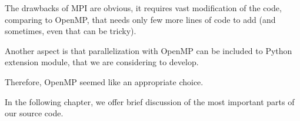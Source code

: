 The drawbacks of MPI are obvious, it requires vast modification of the code, comparing to OpenMP, that needs only few more lines of code to add (and sometimes, even that can be tricky).

Another aspect is that parallelization with OpenMP can be included to Python extension module, that we are considering to develop.

Therefore, OpenMP seemed like an appropriate choice.

In the following chapter, we offer brief discussion of the most important parts of our source code.